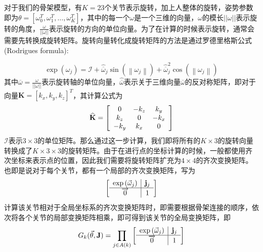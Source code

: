 对于我们的骨架模型，有\(K=23\)个关节表示旋转，加上人整体的旋转，姿势参数即为\(\theta = [\omega_0^T, \omega_1^T, \ldots, \omega_K^T]\)，其中的每一个\(\omega\)是一个三维的向量，\(\omega\)的模长\(||\omega||\)表示旋转的角度，\(\frac{\omega}{||\omega||}\)表示旋转的方向的单位向量。为了在计算的时候表示旋转，通常会需要先转换成旋转矩阵。旋转向量转化成旋转矩阵的方法是通过罗德里格斯公式(Rodrigues formula):

\begin{equation}
    \exp \left(  \omega  _ { j } \right) = \mathcal { I } + \widehat { \overline { \omega }} _ { j } \sin \left( \left\|  \omega  _ { j } \right\| \right) + \widehat { \overline { \omega } } _ { j } ^ { 2 } \cos \left( \left\| \omega_ { j } \right\| \right)
\end{equation}
其中\(\overline { \omega } = \frac{\omega}{||\omega||}\)表示旋转轴的单位向量，\(\widehat { \overline { \omega }}\)表示关于三维向量\(\overline{\omega}\)的反对称矩阵，即对于向量\(\mathbf{K} = [k_x, k_y, k_z]^T\)，其计算公式为
\begin{equation}
\widehat{\mathbf { K }} = \left[ \begin{array} { c c c } { 0 } & { - k _ { z } } & { k _ { y } } \\ { k _ { z } } & { 0 } & { - k _ { x } } \\ { - k _ { y } } & { k _ { x } } & { 0 } \end{array} \right]
\end{equation}
\(\mathcal { I }\)表示\(3\times 3\)的单位矩阵。那么通过这一步计算，我们即将所有的\(K \times 3\)的旋转向量转换成了\(K\times 3 \times 3\)的旋转矩阵。由于在进行点的坐标计算的时候，一般都使用齐次坐标来表示点的位置，因此我们需要将旋转矩阵扩充为\(4\times 4\)的齐次变换矩阵。也即是说对于每个关节，都有一个局部的齐次变换矩阵，写为
\begin{equation}
\left[ \begin{array} { c | c } { \exp \left( \vec { \omega } _ { j } \right) } & { \mathbf { j } _ { j } } \\ \hline \overrightarrow { 0 } & { 1 } \end{array} \right]
\end{equation}
计算该关节相对于全局坐标系的齐次变换矩阵时，即需要根据骨架连接的顺序，依次将各个关节的局部变换矩阵相乘，即可得到该关节的全局变换矩阵，即
\begin{equation}
    G _ { k } ( \vec { \theta } , \mathbf { J } ) = \prod _ { j \in A ( k ) } \left[ \begin{array} { c | c } { \exp \left( \vec { \omega } _ { j } \right) } & { \mathbf { j } _ { j } } \\ \hline \overrightarrow { 0 } & { 1 } \end{array} \right]
\end{equation}
